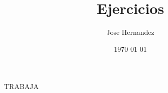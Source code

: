 \documentclass{article}
\title{Ejercicios}
\author{Jose Hernandez}
\date{\today}
\begin{document}
\maketitle

TRABAJA
\end{document}
